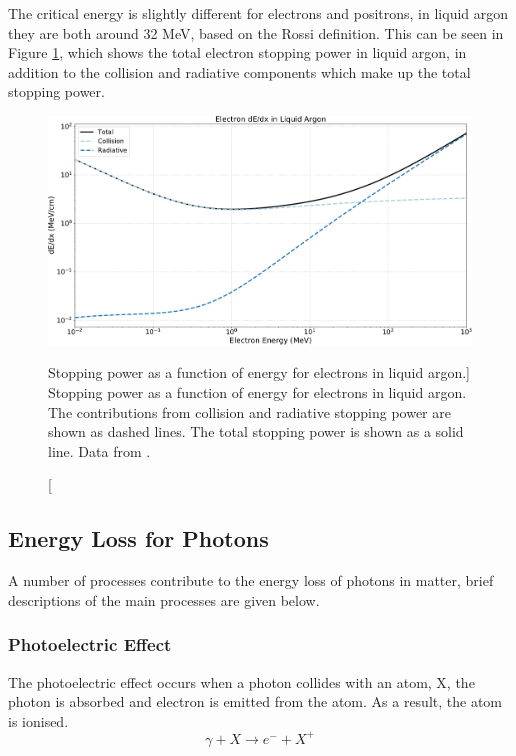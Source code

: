 The critical energy is slightly different for electrons and positrons, in 
liquid argon they are both around 32 MeV, based on the Rossi 
definition\cite{pdg_atomictables}. This can be seen in Figure 
\ref{fig:electron_dedx}, which shows the total electron stopping power in 
liquid argon, in addition to the collision and radiative components which make 
up the total stopping power. 

\begin{figure}

	\centering

	\includegraphics[width=\textwidth]{figures/electron_dedx_argon.pdf}

	\caption
	[Stopping power as a function of energy for electrons in liquid argon.]
	{Stopping power as a function of energy for electrons in liquid argon. The
	contributions from collision and radiative stopping power are shown as dashed
	lines. The total stopping power is shown as a solid line. Data from 
	\cite{estar}.}

	\label{fig:electron_dedx}

\end{figure}

\subsection{Energy Loss for Photons}
A number of processes contribute to the energy loss of photons in matter, brief 
descriptions of the main processes are given below.

\subsubsection*{Photoelectric Effect}
The photoelectric effect occurs when a photon collides with an atom, X, the
photon is absorbed and electron is emitted from the atom. As a result, the atom 
is ionised. 
\begin{equation*}
	\gamma + X \rightarrow e^- + X^+
\end{equation*}

